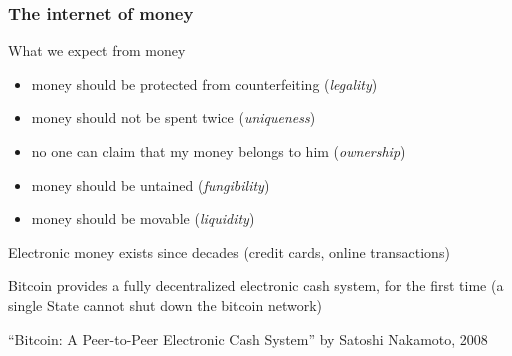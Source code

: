 \documentclass[11pt]{beamer}  %
\begin{document}
\begin{frame}
  \frametitle{The internet of money}

  \begin{greenbox}{What we expect from money}
    \begin{itemize}
    \item money should be protected from counterfeiting (\emph{legality})
    \item money should not be spent twice (\emph{uniqueness})
    \item no one can claim that my money belongs to him (\emph{ownership})
    \item money should be untained (\emph{fungibility})
    \item money should be movable (\emph{liquidity})
    \end{itemize}
  \end{greenbox}

  \bigskip

  Electronic money exists since decades (credit cards, online transactions)

  \bigskip

  \begin{greenbox}{}
    Bitcoin provides a \alert{fully decentralized} electronic cash system, for the first time
    (a single State cannot shut down the bitcoin network)
  \end{greenbox}

  \bigskip

  ``Bitcoin: A Peer-to-Peer Electronic Cash System'' by Satoshi Nakamoto, 2008

\end{frame}
\end{document}
